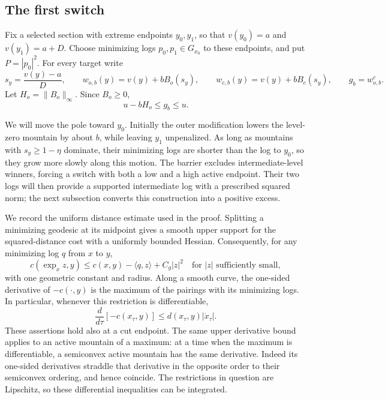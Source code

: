 \subsection{The first switch}

Fix a selected section with extreme endpoints $y_0,y_1$, so that
$v(y_0)=a$ and $v(y_1)=a+D$.  Choose minimizing logs
$p_0,p_1\in G_{x_0}$ to these endpoints, and put $P=|p_0|^2$.
For every target write
\[
 s_y=\frac{v(y)-a}{D},\qquad
 w_{o,b}(y)=v(y)+bB_o(s_y),\qquad
 w_{c,b}(y)=v(y)+bB_c(s_y),\qquad
 g_b=w_{o,b}^c.
\]
Let $H_o=\|B_o\|_\infty$.  Since $B_o\geq0$,
\begin{equation}
 u-bH_o\leq g_b\leq u.
 \label{sc:g-bounds}
\end{equation}

We will move the pole toward $y_0$. Initially the outer modification
lowers the level-zero mountain by about $b$, while leaving $y_1$
unpenalized. As long as mountains with $s_y\geq1-\eta$ dominate, their
minimizing logs are shorter than the log to $y_0$, so they grow more
slowly along this motion. The barrier excludes intermediate-level
winners, forcing a switch with both a low and a high active endpoint.
Their two logs will then provide a supported intermediate log with a
prescribed squared norm; the next subsection converts this construction
into a positive excess.

We record the uniform distance estimate used in the proof.
Splitting a minimizing geodesic at its midpoint gives a smooth upper
support for the squared-distance cost with a uniformly bounded
Hessian.  Consequently, for any minimizing log $q$ from $x$ to $y$,
\begin{equation}
 c(\exp_x z,y)\leq c(x,y)-\langle q,z\rangle+C_g|z|^2
 \quad\text{for }|z|\text{ sufficiently small},
 \label{sc:cost-upper}
\end{equation}
with one geometric constant and radius.  Along a smooth curve, the
one-sided derivative of $-c(\cdot,y)$ is the maximum of the pairings
with its minimizing logs.  In particular, whenever this restriction
is differentiable,
\begin{equation}
 \frac d{d\tau}[-c(x_\tau,y)]
       \leq d(x_\tau,y)|\dot x_\tau|.
 \label{sc:advance}
\end{equation}
These assertions hold also at a cut endpoint.  The same upper
derivative bound applies to an active mountain of a maximum: at a
time when the maximum is differentiable, a semiconvex active mountain
has the same derivative.  Indeed its one-sided derivatives straddle
that derivative in the opposite order to their semiconvex ordering,
and hence coincide.  The restrictions in question are Lipschitz, so
these differential inequalities can be integrated.

